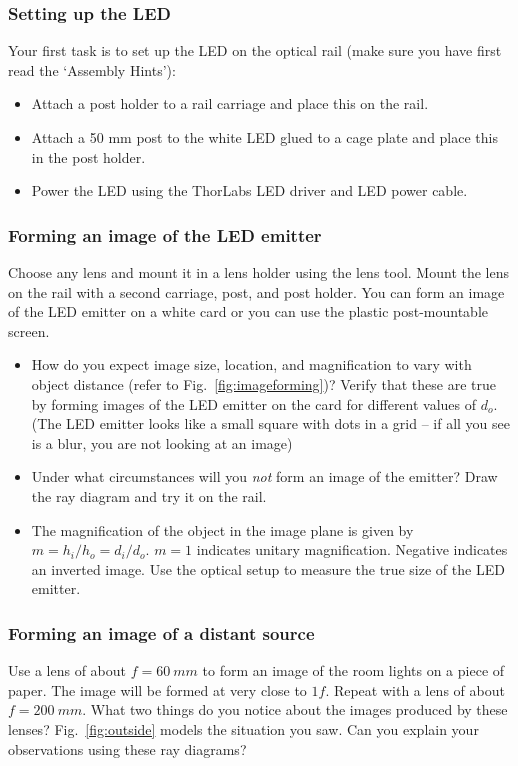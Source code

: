 \documentclass[a4paper]{report}
\begin{document}
	\subsubsection{Setting up the LED}
	Your first task is to set up the LED on the optical rail (make sure you have first read the `Assembly Hints'):
	\begin{itemize}
    \item Attach a post holder to a rail carriage and place this on the rail.
    \item Attach a 50 mm post to the white LED glued to a cage plate and place this in the post holder.
    \item Power the LED using the ThorLabs LED driver and LED power cable.
	\end{itemize}

	\subsubsection{Forming an image of the LED emitter}
	Choose any lens and mount it in a lens holder using the lens tool.
	Mount the lens on the rail with a second carriage, post, and post holder.
	You can form an image of the LED emitter on a white card or you can use the plastic post-mountable screen.

    \begin{itemize}
	    \item How do you expect image size, location, and magnification to vary with object distance (refer to Fig.~\ref{fig:imageforming})? Verify that these are true by forming images of the LED emitter on the card for different values of $d_o$. (The LED emitter looks like a small square with dots in a grid -- if all you see is a blur, you are not looking at an image)
	    \item Under what circumstances will you \emph{not} form an image of the emitter? Draw the ray diagram and try it on the rail.
	    \item The magnification of the object in the image plane is given by  $m = h_i / h_o = d_i / d_o$. $m=1$ indicates unitary magnification. Negative indicates an inverted image.
	Use the optical setup to measure the true size of the LED emitter.
	\end{itemize}

    \clearpage

	\subsubsection{Forming an image of a distant source}
    Use a lens of about $f=60~mm$ to form an image of the room lights on a piece of paper.
    The image will be formed at very close to $1f$.
    Repeat with a lens of about $f=200~mm$.
    What two things do you notice about the images produced by these lenses?
    Fig.~\ref{fig:outside} models the situation you saw.
    Can you explain your observations using these ray diagrams?
\end{document}

